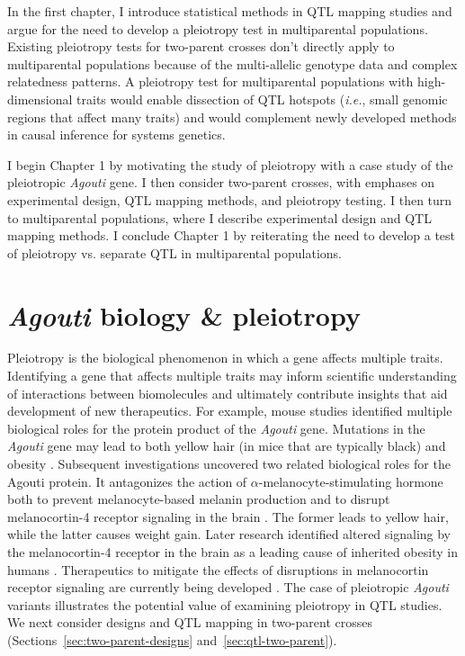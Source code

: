 \documentclass[oneside]{book}\usepackage[]{graphicx}\usepackage[]{color}
\begin{document}
In the first chapter, I introduce statistical methods in QTL 
mapping studies and argue for the need to develop a pleiotropy test
in multiparental populations. Existing pleiotropy tests for two-parent
crosses don't directly apply to multiparental populations because of the
multi-allelic genotype data and complex relatedness patterns.
A pleiotropy test for multiparental populations with high-dimensional
traits would enable dissection of QTL hotspots (\emph{i.e.}, small 
genomic regions that affect many traits) and would complement newly 
developed methods in causal inference for systems genetics.


I begin Chapter 1 by motivating the study of
pleiotropy with a case study of the pleiotropic \emph{Agouti} gene.
I then consider two-parent crosses, with emphases on experimental design,
QTL mapping methods, and pleiotropy testing. 
I then turn to multiparental populations, where I describe experimental
design and QTL mapping
methods. I conclude Chapter 1 by reiterating the need to develop a
test of pleiotropy vs. separate QTL in multiparental populations.




\section{\emph{Agouti} biology \& pleiotropy}
Pleiotropy is the biological phenomenon in which a gene affects multiple traits. 
Identifying a gene that affects multiple traits may inform scientific understanding of
interactions between biomolecules and ultimately contribute insights that aid development
of new therapeutics. 
For example, mouse studies identified multiple biological roles for the protein product of 
the \emph{Agouti} gene. Mutations in the \emph{Agouti} gene may lead to both 
yellow hair (in mice that are typically black) and obesity \citep{attie2017how}.
Subsequent investigations uncovered two related biological roles for the Agouti protein.
It antagonizes the action of $\alpha$-melanocyte-stimulating hormone both to
prevent melanocyte-based melanin production and to disrupt melanocortin-4
receptor signaling in the brain \citep{lu1994agouti,klebig1995ectopic,huszar1997targeted}.
The former leads to yellow hair, while the latter causes weight gain.
Later research identified altered signaling by the melanocortin-4 receptor in
the brain as a leading cause of inherited obesity in humans \citep{farooqi2003clinical,vaisse2000melanocortin}.
Therapeutics to mitigate the effects of disruptions in melanocortin receptor signaling are
currently being developed \citep{macneil2002role,fani2014melanocortin}.
The case of pleiotropic \emph{Agouti} variants illustrates the potential value of examining pleiotropy in QTL studies.
We next consider designs and QTL mapping in two-parent crosses (Sections~\ref{sec:two-parent-designs} and~\ref{sec:qtl-two-parent}).
\end{document}
